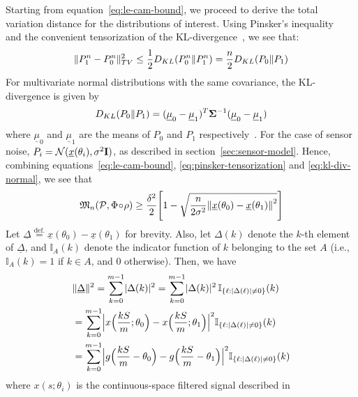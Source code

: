 \documentclass[conference,letterpaper]{IEEEtran}
\providecommand{\v}{}
\renewcommand{\v}[1]{\underline{#1}}
\providecommand{\m}{}
\renewcommand{\m}[1]{{\bf #1}}
\DeclarePairedDelimiter\abs{\lvert}{\rvert}
\DeclarePairedDelimiter\norm{\lVert}{\rVert}
\newcommand{\Phiorho}{\Phi\!\circ\!\rho}
\begin{document}
\begin{IEEEproof}
Starting from equation~\eqref{eq:le-cam-bound}, we proceed to derive the total
variation distance for the distributions of interest. Using Pinsker's
inequality~\cite[Lemma~2.5]{Tsybakov2009Introduction} and the convenient
tensorization of the KL-divergence~\cite{Duchi2015Information}, we see that:
\begin{equation} \label{eq:pinsker-tensorization}
	\norm{P_1^n - P_0^n}_{TV}^2 \leq \frac{1}{2} D_{KL}(P_0^n \Vert P_1^n) = \frac{n}{2} D_{KL}(P_0 \Vert P_1)
\end{equation}
For multivariate normal distributions with the same covariance, the
KL-divergence is given by
\begin{equation} \label{eq:kl-div-normal}
	D_{KL}(P_0 \Vert P_1) = (\v \mu_0 - \v \mu_1)^T \m \Sigma^{-1} (\v \mu_0 - \v \mu_1)
\end{equation}
where $\v \mu_0$ and $\v \mu_1$ are the means of $P_0$ and $P_1$
respectively~\cite{DuchiDerivation}. For the case of sensor noise, $P_i =
\mathcal{N}(\v x(\theta_i), \sigma^2 \m I)$, as described in
section~\ref{sec:sensor-model}. Hence, combining
equations~\eqref{eq:le-cam-bound}, \eqref{eq:pinsker-tensorization} and
\eqref{eq:kl-div-normal}, we see that
\begin{equation} \label{eq:lb-after-pinsker}
	\mathfrak{M}_n(\mathcal{P}, \Phiorho) \geq \frac{\delta^2}{2} \Bigg[ 1 - \sqrt{ \frac{n}{2\sigma^2} \norm*{\v x(\theta_0) - \v x(\theta_1)}^2 } \Bigg]
\end{equation}
Let $\v \Delta \overset{\text{def.}}{=} \v x(\theta_0) - \v x(\theta_1)$ for
brevity. Also, let $\Delta(k)$ denote the $k$-th element of $\v\Delta$, and
$\mathbb I_A(k)$ denote the indicator function of $k$ belonging to the set $A$
(i.e., $\mathbb I_A(k) = 1$ if $k \in A$, and $0$ otherwise). Then, we have
\begin{align}
	&\norm{\v\Delta}^2 = \sum_{k=0}^{m-1} \abs{\Delta(k)}^2 = \sum_{k=0}^{m-1} \abs{\Delta(k)}^2 \, \mathbb I_{\{\ell: \abs{\Delta(\ell)} \neq 0\}}(k) \\
	&= \sum_{k=0}^{m-1} \abs[\Big]{x\Big(\frac{kS}{m}; \theta_0\Big) - x\Big(\frac{kS}{m}; \theta_1\Big)}^2 \mathbb I_{\{\ell: \abs{\Delta(\ell)} \neq 0\}}(k) \\
	&= \sum_{k=0}^{m-1} \abs[\Big]{g\Big(\frac{kS}{m} - \theta_0\Big) - g\Big(\frac{kS}{m} - \theta_1\Big)}^2 \mathbb I_{\{\ell: \abs{\Delta(\ell)} \neq 0\}}(k)
\end{align}
where $x(s;\theta_i)$ is the continuous-space filtered signal described in

\end{IEEEproof}
\end{document}

